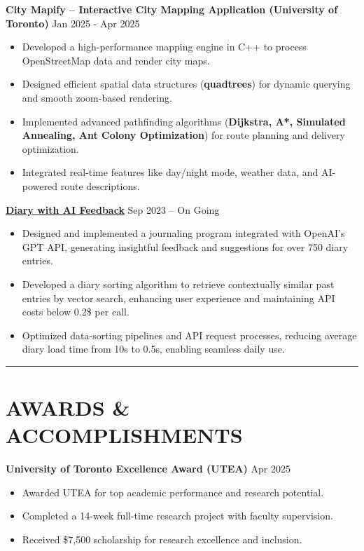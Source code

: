 \documentclass[a4paper,10pt]{article}
\begin{document}
\vspace{0.3cm}
\noindent\textbf{City Mapify – Interactive City Mapping Application (University of Toronto)} \hfill Jan 2025 - Apr 2025
\begin{itemize}[leftmargin=0.2in]
    \item Developed a high-performance mapping engine in C++ to process OpenStreetMap data and render city maps.
    \item Designed efficient spatial data structures (\textbf{quadtrees}) for dynamic querying and smooth zoom-based rendering.
    \item Implemented advanced pathfinding algorithms (\textbf{Dijkstra, A*, Simulated Annealing, Ant Colony Optimization}) for route planning and delivery optimization.
    \item Integrated real-time features like day/night mode, weather data, and AI-powered route descriptions.
\end{itemize}


\vspace{0.3cm}
\noindent\href{https://github.com/Ken-2511/Diary-with-ChatGPT-Comment}{\uline{
\textbf{Diary with AI Feedback}}} \hfill Sep 2023 -- On Going
\begin{itemize}[leftmargin=0.2in]
    \item Designed and implemented a journaling program integrated with OpenAI’s GPT API, generating insightful feedback and suggestions for over 750 diary entries.
    \item Developed a diary sorting algorithm to retrieve contextually similar past entries by vector search, enhancing user experience and maintaining API costs below 0.2\$ per call.
    \item Optimized data-sorting pipelines and API request processes, reducing average diary load time from 10s to 0.5s, enabling seamless daily use.
\end{itemize}

\noindent\rule{\linewidth}{1pt}

\section*{\textbf{AWARDS \& ACCOMPLISHMENTS}}

\noindent\textbf{University of Toronto Excellence Award (UTEA)} \hfill Apr 2025
\begin{itemize}[leftmargin=0.2in]
    \item Awarded UTEA for top academic performance and research potential.
    \item Completed a 14-week full-time research project with faculty supervision.
    \item Received \$7,500 scholarship for research excellence and inclusion.
\end{itemize}
\end{document}
